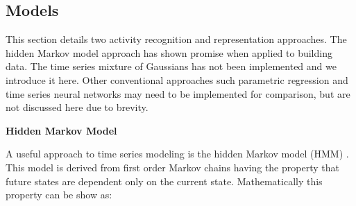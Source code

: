 




\subsection{Models}
This section details two activity recognition and representation approaches.  The hidden Markov model approach has shown promise when applied to building data.  The time series mixture of Gaussians has not been implemented and we introduce it here.  Other conventional approaches such parametric regression and time series neural networks may need to be implemented for comparison, but are not discussed here due to brevity.\newline

\textbf{Hidden Markov Model} 

A useful approach to time series modeling is the hidden Markov model (HMM) \cite{Rabiner1989,Juang1991}.  This model is derived from first order Markov chains having the property that future states are dependent only on the current state.  Mathematically this property can be show as:

